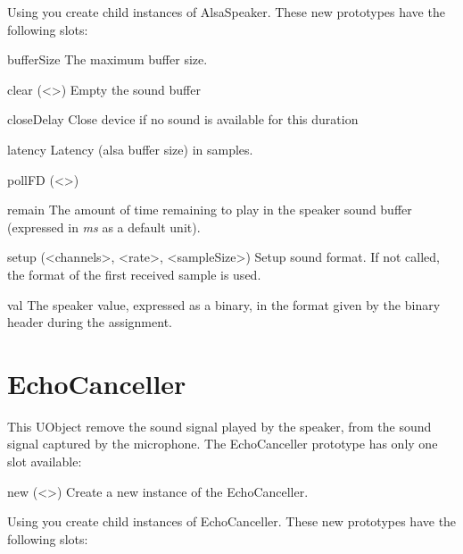 Using  you create child instances of AlsaSpeaker. These new prototypes have the following slots:

\begin{urbiscriptapi}
\item[bufferSize] The maximum buffer size.
\item[clear](<>) Empty the sound buffer
\item[closeDelay] Close device if no sound is available for this duration
\item[latency] Latency (alsa buffer size) in samples.
\item[pollFD](<>)
\item[remain] The amount of time remaining to play in the speaker sound
  buffer (expressed in \textit{ms} as a default unit).
\item[setup](<channels>, <rate>, <sampleSize>) Setup sound format. If not called, the format of the first received sample is used.
\item[val] The speaker value, expressed as a binary, in the format given by
  the binary header during the assignment.
\end{urbiscriptapi}

\section{EchoCanceller}

This UObject remove the sound signal played by the speaker, from the sound signal captured by the microphone.
The EchoCanceller prototype has only one slot available:

\begin{urbiscriptapi}
\item[new](<>) Create a new instance of the EchoCanceller.
\end{urbiscriptapi}

Using  you create child instances of EchoCanceller. These new prototypes have the following slots:

